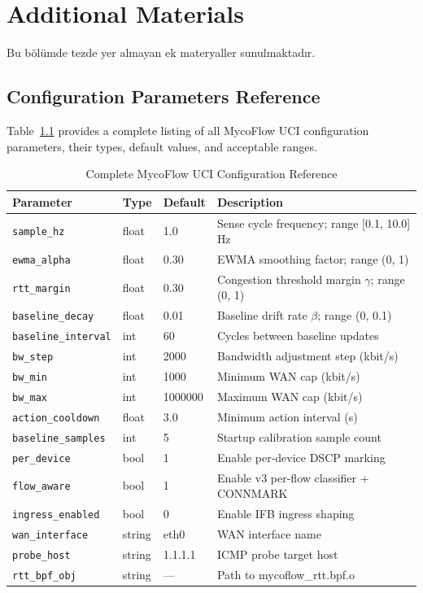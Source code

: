 \chapter{Additional Materials}\label{chapter:appendix}

Bu bölümde tezde yer almayan ek materyaller sunulmaktadır.

\section{Configuration Parameters Reference}

Table~\ref{tab:cfg_full} provides a complete listing of all MycoFlow UCI configuration parameters, their types, default values, and acceptable ranges.

\begin{table}[h]
\caption{Complete MycoFlow UCI Configuration Reference}
\label{tab:cfg_full}
\centering
\small
{\setlength{\tabcolsep}{4pt}
\begin{tabular}{p{4cm}p{1.5cm}p{2cm}p{5cm}}
\toprule
\textbf{Parameter} & \textbf{Type} & \textbf{Default} & \textbf{Description} \\
\midrule
\texttt{sample\_hz}         & float & 1.0     & Sense cycle frequency; range [0.1, 10.0] Hz \\
\texttt{ewma\_alpha}        & float & 0.30    & EWMA smoothing factor; range (0, 1) \\
\texttt{rtt\_margin}        & float & 0.30    & Congestion threshold margin $\gamma$; range (0, 1) \\
\texttt{baseline\_decay}    & float & 0.01    & Baseline drift rate $\beta$; range (0, 0.1) \\
\texttt{baseline\_interval} & int   & 60      & Cycles between baseline updates \\
\texttt{bw\_step}           & int   & 2000    & Bandwidth adjustment step (kbit/s) \\
\texttt{bw\_min}            & int   & 1000    & Minimum WAN cap (kbit/s) \\
\texttt{bw\_max}            & int   & 1000000 & Maximum WAN cap (kbit/s) \\
\texttt{action\_cooldown}   & float & 3.0     & Minimum action interval (s) \\
\texttt{baseline\_samples}  & int   & 5       & Startup calibration sample count \\
\texttt{per\_device}        & bool  & 1       & Enable per-device DSCP marking \\
\texttt{flow\_aware}        & bool  & 1       & Enable v3 per-flow classifier + CONNMARK \\
\texttt{ingress\_enabled}   & bool  & 0       & Enable IFB ingress shaping \\
\texttt{wan\_interface}     & string & eth0   & WAN interface name \\
\texttt{probe\_host}        & string & 1.1.1.1 & ICMP probe target host \\
\texttt{rtt\_bpf\_obj}      & string & ---    & Path to mycoflow\_rtt.bpf.o \\
\bottomrule
\end{tabular}}
\end{table}

